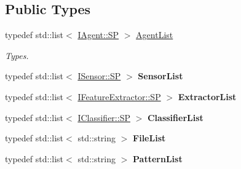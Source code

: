 \subsection*{Public Types}
\begin{DoxyCompactItemize}
\item 
\mbox{\label{class_self_instance_afe9d48a50ea3b492ee170aee2df222bf}} 
typedef std\+::list$<$ \hyperlink{class_i_agent_a9e88f0528d282c33200a2d43d1c29a73}{I\+Agent\+::\+SP} $>$ \hyperlink{class_self_instance_afe9d48a50ea3b492ee170aee2df222bf}{Agent\+List}
\begin{DoxyCompactList}\small\item\em Types. \end{DoxyCompactList}\item 
\mbox{\label{class_self_instance_ae5004b7bbdce41e586fafd135fe00bb6}} 
typedef std\+::list$<$ \hyperlink{class_i_sensor_a9c8b231fdda50c9d368e47ef5b9d0faf}{I\+Sensor\+::\+SP} $>$ {\bfseries Sensor\+List}
\item 
\mbox{\label{class_self_instance_a9d262b06f2f0cc0ec7a20c30eabc7a1d}} 
typedef std\+::list$<$ \hyperlink{class_i_feature_extractor_accaef91768ee64d51b4dc959f36e9f08}{I\+Feature\+Extractor\+::\+SP} $>$ {\bfseries Extractor\+List}
\item 
\mbox{\label{class_self_instance_a073a63332a5268e5110754c649e79837}} 
typedef std\+::list$<$ \hyperlink{class_i_classifier_a532d21507aef94011669a0b73bd49c2d}{I\+Classifier\+::\+SP} $>$ {\bfseries Classifier\+List}
\item 
\mbox{\label{class_self_instance_a8ad7e4fb3916e304c53be9935ed55ee3}} 
typedef std\+::list$<$ std\+::string $>$ {\bfseries File\+List}
\item 
\mbox{\label{class_self_instance_ab4c4fa2e00d630925101564cd74b484f}} 
typedef std\+::list$<$ std\+::string $>$ {\bfseries Pattern\+List}
\end{DoxyCompactItemize}
